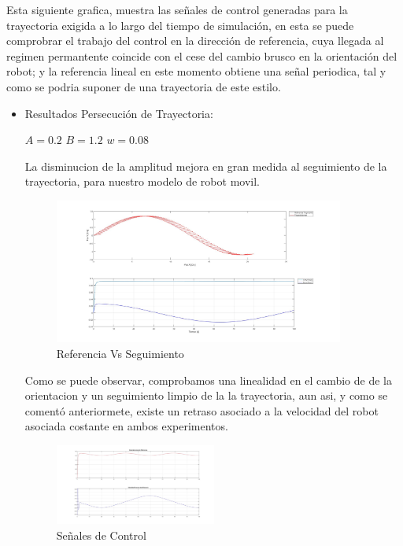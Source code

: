 \documentclass[a4paper,twoside]{article}
\begin{document}
\begin{itemize}
	Esta siguiente grafica, muestra las señales de control generadas para la trayectoria exigida
	a lo largo del tiempo de simulación, en esta se puede comprobrar el trabajo del control en la 
	dirección de referencia, cuya llegada al regimen permantente coincide  con el cese del cambio 
	brusco en la orientación del robot; y la referencia lineal en este momento obtiene una señal periodica, 
	tal y como se podria suponer de una trayectoria de este estilo.\\

	\end{itemize}



\begin{itemize}
	\item Resultados Persecución de Trayectoria:
	\begin{center}
		$A=0.2$    \hspace{0.2cm}   
		$B=1.2$    \hspace{0.2cm} 
		$w=0.08$ \\
	\end{center}

	La disminucion de la amplitud mejora en gran medida al seguimiento de la trayectoria, para nuestro
	modelo de robot movil.\\
	\begin{figure}[h!]
		\centering
		\includegraphics[width=0.9\textwidth]{PurePursuitSeguimientoFlama_Error}
		\caption{Referencia Vs Seguimiento}
	\end{figure}

	Como se puede observar, comprobamos una linealidad en el cambio de de la orientacion y un seguimiento
	limpio de la la trayectoria, aun asi, y como se comentó anteriormete, existe un retraso asociado a la 
	velocidad del robot asociada costante en ambos experimentos.

	\begin{figure}[h!]
		\centering
		\includegraphics[width=0.5\textwidth]{PurePursuitValoresEntradaFlama}
		\caption{Señales de Control}
	\end{figure}


\end{itemize}
\end{document}
